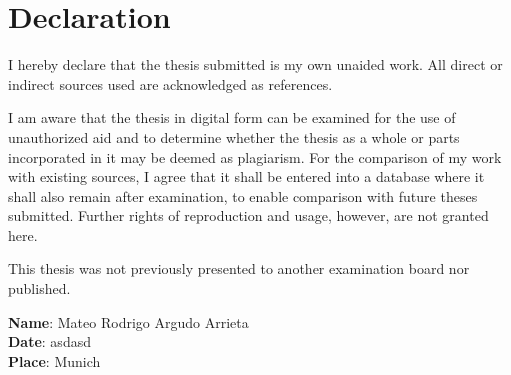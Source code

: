 \chapter*{Declaration}
\vspace{1cm}

I hereby declare that the thesis submitted is my own unaided work. All direct or indirect sources used are acknowledged as references.

I am aware that the thesis in digital form can be examined for the use of unauthorized aid and to determine whether the thesis as a whole or parts incorporated in it may be deemed as plagiarism. For the comparison of my work with existing sources, I agree that it shall be entered into a database where it shall also remain after examination, to enable comparison with future theses submitted. Further rights of reproduction and usage, however, are not granted here.

This thesis was not previously presented to another examination board nor published.\\
\begin{flushleft}
\textbf{Name}: Mateo Rodrigo Argudo Arrieta \\
\textbf{Date}: asdasd \\
\textbf{Place}: Munich
\end{flushleft}
